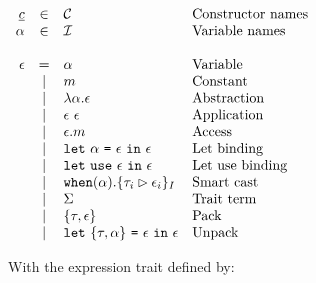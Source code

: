 \documentclass{article}[11pt]
\newcommand{\term}[1]{\verb~#1~}
\begin{document}
    \begin{math}
        \begin{array}{rclp{5cm}}
            \underline{c} & \in  & {\cal C}                                                                & Constructor names \\
            \alpha        & \in  & {\cal I}                                                                & Variable names    \\
            \\
            \epsilon & =
            & \alpha                                                                         & Variable              \\
            & \mid & m                                                                       & Constant              \\
            & \mid & \lambda \alpha . \epsilon                                               & Abstraction              \\
            & \mid & \epsilon ~ \epsilon                                                     & Application              \\
            & \mid & \epsilon . m                                                         & Access              \\
            & \mid & \term{let}~\alpha ~ \term{=} ~ \epsilon ~\term{in}~\epsilon             & Let~binding              \\
            & \mid & \term{let}~\term{use} ~ \epsilon ~\term{in}~\epsilon                    & Let~use~binding              \\
            & \mid & \term{when}(\alpha).\{ \tau_i \rhd \epsilon_i \}_I                      & Smart cast              \\
            & \mid & \Sigma                                                                  & Trait~term              \\
            & \mid & \{\tau, \epsilon\}                                                      & Pack              \\
            & \mid & \term{let} ~ \{\tau, \alpha\} ~ \term{=} ~ \epsilon ~\term{in}~\epsilon & Unpack               \\
        \end{array} \\
    \end{math}

    With the expression trait defined by: \\
\end{document}
